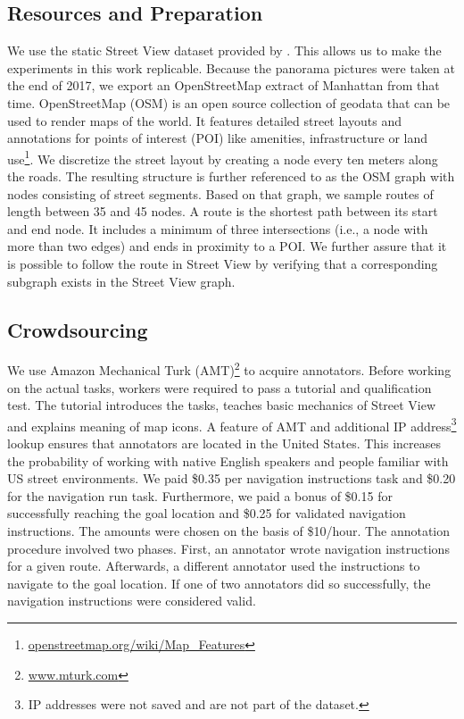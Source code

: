 \documentclass[11pt,a4paper]{article}
\begin{document}
\subsection{Resources and Preparation}
\label{sec:res_and_prep}
We use the static Street View dataset provided by \citet{chen-etal-2019-touchdown}. This allows us to make the experiments in this work replicable. Because the panorama pictures were taken at the end of 2017, we export an OpenStreetMap extract of Manhattan from that time. OpenStreetMap (OSM) is an open source collection of geodata that can be used to render maps of the world. It features detailed street layouts and annotations for points of interest (POI) like amenities, infrastructure or land use\footnote{\url{openstreetmap.org/wiki/Map_Features}}.
We discretize the street layout by creating a node every ten meters along the roads. The resulting structure is further referenced to as the OSM graph with nodes consisting of street segments. Based on that graph, we sample routes of length between 35 and 45 nodes. A route is the shortest path between its start and end node. It includes a minimum of three intersections (i.e., a node with more than two edges) and ends in proximity to a POI. We further assure that it is possible to follow the route in Street View by verifying that a corresponding subgraph exists in the Street View graph.

\subsection{Crowdsourcing}
We use Amazon Mechanical Turk (AMT)\footnote{\url{www.mturk.com}} to acquire annotators. Before working on the actual tasks, workers were required to pass a tutorial and qualification test. The tutorial introduces the tasks, teaches basic mechanics of Street View and explains meaning of map icons. A feature of AMT and additional IP address\footnote{IP addresses were not saved and are not part of the dataset.} lookup ensures that annotators are located in the United States. This increases the probability of working with native English speakers and people familiar with US street environments. We paid \$0.35 per navigation instructions task and \$0.20 for the navigation run task. Furthermore, we paid a bonus of \$0.15 for successfully reaching the goal location and \$0.25 for validated navigation instructions. The amounts were chosen on the basis of \$10/hour.
The annotation procedure involved two phases. First, an annotator wrote navigation instructions for a given route. Afterwards, a different annotator used the instructions to navigate to the goal location. If one of two annotators did so successfully, the navigation instructions were considered valid.
\end{document}
